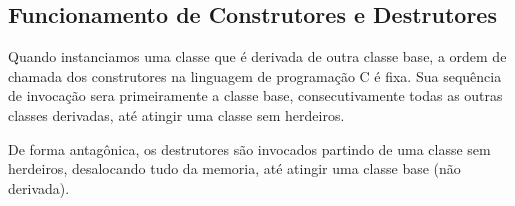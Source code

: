 \documentclass[a4paper, 12pt]{article}
\def\Cplusplus{C\raisebox{0.5ex}{\tiny\textbf{++}} }
\begin{document}
		\subsection{Funcionamento de Construtores e Destrutores}
		
		Quando instanciamos uma classe que é derivada de outra classe base, a ordem de chamada dos construtores na linguagem de programação \Cplusplus é fixa. Sua sequência de invocação sera primeiramente a classe base, consecutivamente todas as outras classes derivadas, até atingir uma classe sem herdeiros.
		
		De forma antagônica, os destrutores são invocados partindo de uma classe sem herdeiros, desalocando tudo da memoria, até atingir uma classe base (não derivada).
		
\end{document}

